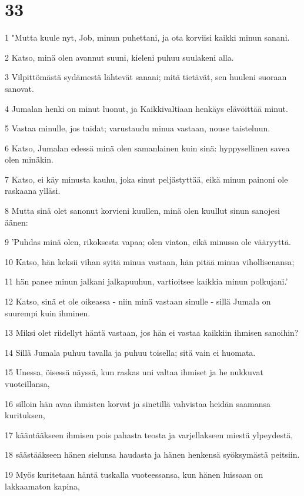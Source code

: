\chapter{33}

\par 1 "Mutta kuule nyt, Job, minun puhettani, ja ota korviisi kaikki minun sanani.
\par 2 Katso, minä olen avannut suuni, kieleni puhuu suulakeni alla.
\par 3 Vilpittömästä sydämestä lähtevät sanani; mitä tietävät, sen huuleni suoraan sanovat.
\par 4 Jumalan henki on minut luonut, ja Kaikkivaltiaan henkäys elävöittää minut.
\par 5 Vastaa minulle, jos taidat; varustaudu minua vastaan, nouse taisteluun.
\par 6 Katso, Jumalan edessä minä olen samanlainen kuin sinä: hyppysellinen savea olen minäkin.
\par 7 Katso, ei käy minusta kauhu, joka sinut peljästyttää, eikä minun painoni ole raskaana ylläsi.
\par 8 Mutta sinä olet sanonut korvieni kuullen, minä olen kuullut sinun sanojesi äänen:
\par 9 'Puhdas minä olen, rikoksesta vapaa; olen viaton, eikä minussa ole vääryyttä.
\par 10 Katso, hän keksii vihan syitä minua vastaan, hän pitää minua vihollisenansa;
\par 11 hän panee minun jalkani jalkapuuhun, vartioitsee kaikkia minun polkujani.'
\par 12 Katso, sinä et ole oikeassa - niin minä vastaan sinulle - sillä Jumala on suurempi kuin ihminen.
\par 13 Miksi olet riidellyt häntä vastaan, jos hän ei vastaa kaikkiin ihmisen sanoihin?
\par 14 Sillä Jumala puhuu tavalla ja puhuu toisella; sitä vain ei huomata.
\par 15 Unessa, öisessä näyssä, kun raskas uni valtaa ihmiset ja he nukkuvat vuoteillansa,
\par 16 silloin hän avaa ihmisten korvat ja sinetillä vahvistaa heidän saamansa kurituksen,
\par 17 kääntääkseen ihmisen pois pahasta teosta ja varjellakseen miestä ylpeydestä,
\par 18 säästääkseen hänen sielunsa haudasta ja hänen henkensä syöksymästä peitsiin.
\par 19 Myös kuritetaan häntä tuskalla vuoteessansa, kun hänen luissaan on lakkaamaton kapina,
